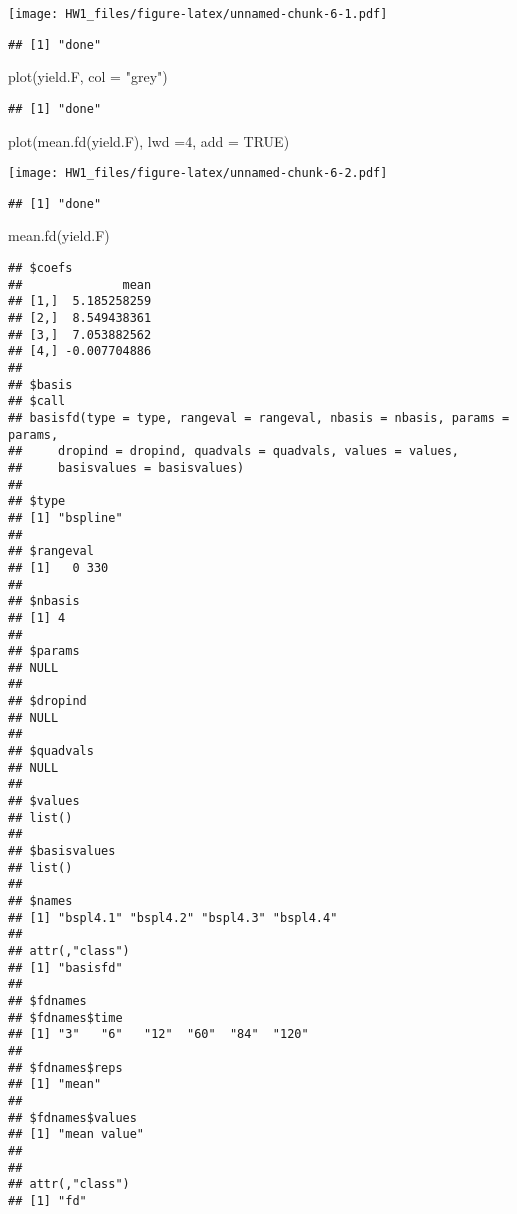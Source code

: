 \documentclass[
]{article}
\newenvironment{Shaded}{\begin{snugshade}}{\end{snugshade}}
\newcommand{\AttributeTok}[1]{\textcolor[rgb]{0.77,0.63,0.00}{#1}}
\newcommand{\ConstantTok}[1]{\textcolor[rgb]{0.00,0.00,0.00}{#1}}
\newcommand{\DecValTok}[1]{\textcolor[rgb]{0.00,0.00,0.81}{#1}}
\newcommand{\FunctionTok}[1]{\textcolor[rgb]{0.00,0.00,0.00}{#1}}
\newcommand{\NormalTok}[1]{#1}
\newcommand{\StringTok}[1]{\textcolor[rgb]{0.31,0.60,0.02}{#1}}
\begin{document}
\texttt{[image: HW1\_files/figure-latex/unnamed-chunk-6-1.pdf]}

\begin{verbatim}
## [1] "done"
\end{verbatim}

\begin{Shaded}
\begin{Highlighting}[]
\FunctionTok{plot}\NormalTok{(yield.F, }\AttributeTok{col =} \StringTok{"grey"}\NormalTok{)}
\end{Highlighting}
\end{Shaded}

\begin{verbatim}
## [1] "done"
\end{verbatim}

\begin{Shaded}
\begin{Highlighting}[]
\FunctionTok{plot}\NormalTok{(}\FunctionTok{mean.fd}\NormalTok{(yield.F), }\AttributeTok{lwd =}\DecValTok{4}\NormalTok{, }\AttributeTok{add =} \ConstantTok{TRUE}\NormalTok{)}
\end{Highlighting}
\end{Shaded}

\texttt{[image: HW1\_files/figure-latex/unnamed-chunk-6-2.pdf]}

\begin{verbatim}
## [1] "done"
\end{verbatim}

\begin{Shaded}
\begin{Highlighting}[]
\FunctionTok{mean.fd}\NormalTok{(yield.F)}
\end{Highlighting}
\end{Shaded}

\begin{verbatim}
## $coefs
##              mean
## [1,]  5.185258259
## [2,]  8.549438361
## [3,]  7.053882562
## [4,] -0.007704886
## 
## $basis
## $call
## basisfd(type = type, rangeval = rangeval, nbasis = nbasis, params = params, 
##     dropind = dropind, quadvals = quadvals, values = values, 
##     basisvalues = basisvalues)
## 
## $type
## [1] "bspline"
## 
## $rangeval
## [1]   0 330
## 
## $nbasis
## [1] 4
## 
## $params
## NULL
## 
## $dropind
## NULL
## 
## $quadvals
## NULL
## 
## $values
## list()
## 
## $basisvalues
## list()
## 
## $names
## [1] "bspl4.1" "bspl4.2" "bspl4.3" "bspl4.4"
## 
## attr(,"class")
## [1] "basisfd"
## 
## $fdnames
## $fdnames$time
## [1] "3"   "6"   "12"  "60"  "84"  "120"
## 
## $fdnames$reps
## [1] "mean"
## 
## $fdnames$values
## [1] "mean value"
## 
## 
## attr(,"class")
## [1] "fd"
\end{verbatim}
\end{document}
